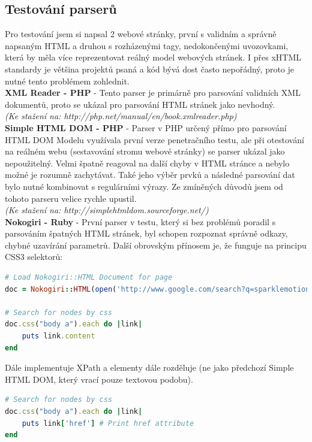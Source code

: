 \documentclass[12pt, a4paper]{report}
\begin{document}
\subsection{Testování parserů}
Pro testování jsem si napsal 2 webové stránky, první s validním a správně napsaným HTML a druhou s rozházenými tagy, nedokončenými uvozovkami, která by měla více reprezentovat reálný model webových stránek. I přes xHTML standardy je většina projektů psaná  a kód bývá dost často nepořádný, proto je nutné tento problémem zohlednit.\\
\newline
\textbf{XML Reader - PHP} - Tento parser je primárně pro parsování validních XML dokumentů, proto se ukázal pro parsování HTML stránek jako nevhodný.\\
\textit{(Ke stažení na: http://php.net/manual/en/book.xmlreader.php)}\\
\newline
\textbf{Simple HTML DOM - PHP} - Parser v PHP určený přímo pro parsování HTML DOM Modelu využívala první verze penetračního testu, ale při otestování na reálném webu (sestavování stromu webové stránky) se parser ukázal jako nepoužitelný. Velmi špatně reagoval na další chyby v HTML stránce a nebylo možné je rozumně zachytávat. Také jeho výběr prvků a následné parsování dat bylo nutné kombinovat s regulárními výrazy. Ze zmíněných důvodů jsem od tohoto parseru velice rychle upustil.\\
\textit{(Ke stažení na: http://simplehtmldom.sourceforge.net/)}\\
\newline
\textbf{Nokogiri - Ruby} - První parser v testu, který si bez problémů poradil s parsováním špatných HTML stránek, byl schopen rozpoznat správně odkazy, chybné uzavírání parametrů. Další obrovským přínosem je, že funguje na principu CSS3 selektorů:
\begin{lstlisting}[label=some-code,language=Ruby, caption=CSS3 Selektory NokoGiri]
# Load Nokogiri::HTML Document for page
doc = Nokogiri::HTML(open('http://www.google.com/search?q=sparklemotion'))

# Search for nodes by css
doc.css("body a").each do |link|
	puts link.content
end
\end{lstlisting}
Dále implementuje XPath a elementy dále rozděluje (ne jako předchozí Simple HTML DOM, který vrací pouze textovou podobu).
\begin{lstlisting}[label=some-code,language=Ruby, caption=Parsování]
# Search for nodes by css
doc.css("body a").each do |link|
	puts link['href'] # Print href attribute
end
\end{lstlisting}
\end{document}
